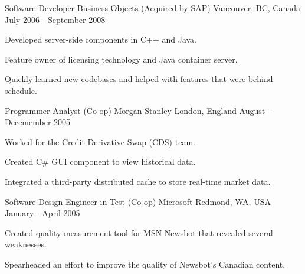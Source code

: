 \begin{cventries}
  \cventry
    {Software Developer} %
    {Business Objects (Acquired by SAP)} %
    {Vancouver, BC, Canada} %
    {July 2006 - September 2008} %
    {
      \begin{cvitems} %
        \item {Developed server-side components in C++ and Java.}
        \item {Feature owner of licensing technology and Java container server.}
        \item {Quickly learned new codebases and helped with features that were behind schedule.}
      \end{cvitems}
    }

  \cventry
    {Programmer Analyst (Co-op)} %
    {Morgan Stanley} %
    {London, England} %
    {August - Decemember 2005} %
    {
      \begin{cvitems} %
        \item {Worked for the Credit Derivative Swap (CDS) team.}
        \item {Created C# GUI component to view historical data.}
        \item {Integrated a third-party distributed cache to store real-time market data.}
      \end{cvitems}
    }

  \cventry
    {Software Design Engineer in Test (Co-op)} %
    {Microsoft} %
    {Redmond, WA, USA} %
    {January - April 2005} %
    {
      \begin{cvitems} %
        \item {Created quality measurement tool for MSN Newsbot that revealed several weaknesses.}
        \item {Spearheaded an effort to improve the quality of Newsbot’s Canadian content.}
      \end{cvitems}
    }

\end{cventries}
